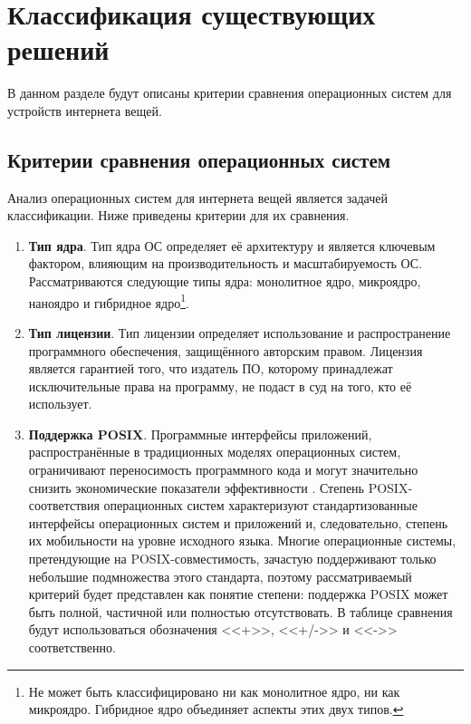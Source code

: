\section{Классификация существующих решений}

В данном разделе будут описаны критерии сравнения операционных систем для устройств интернета вещей.



\subsection{Критерии сравнения операционных систем}

Анализ операционных систем для интернета вещей является задачей классификации. Ниже приведены критерии для их сравнения.

\begin{enumerate}[label*=\arabic*.]
	\item \textbf{Тип ядра}. \newline
	Тип ядра ОС определяет её архитектуру и является ключевым фактором, влияющим на производительность и масштабируемость ОС. Рассматриваются следующие типы ядра: монолитное ядро, микроядро, наноядро и гибридное ядро\footnote{Не может быть классифицировано ни как монолитное ядро, ни как микроядро. Гибридное ядро объединяет аспекты этих двух типов.}.
	
	\item \textbf{Тип лицензии}. \newline
	Тип лицензии определяет использование и распространение программного обеспечения, защищённого авторским правом. Лицензия является гарантией того, что издатель ПО, которому принадлежат исключительные права на программу, не подаст в суд на того, кто её использует.
	
	\item \textbf{Поддержка POSIX}. \newline
	Программные интерфейсы приложений, распространённые в традиционных моделях операционных систем, ограничивают переносимость программного кода и могут значительно снизить экономические показатели эффективности \cite{Posix}. Степень POSIX-соответствия операционных систем характеризуют стандартизованные интерфейсы операционных систем и приложений и, следовательно, степень их мобильности на уровне исходного языка. Многие операционные системы, претендующие на POSIX-совместимость, зачастую поддерживают только небольшие подмножества этого стандарта, поэтому рассматриваемый критерий будет представлен как понятие степени: поддержка POSIX может быть полной, частичной или полностью отсутствовать. В таблице сравнения будут использоваться обозначения <<+>>, <<+/->> и <<->> соответственно.
	

\end{enumerate}
